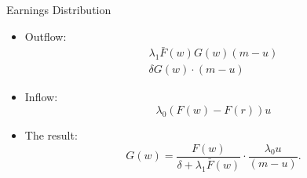 \documentclass{beamer}
\begin{document}
\begin{frame}{Earnings Distribution}
    \begin{itemize}
        \item Outflow:
              \[
                  \begin{gathered}
                      \lambda_{1} \bar{F}(w) G(w)(m-u) \\
                      \delta G(w) \cdot(m-u)
                  \end{gathered}
              \]
        \item Inflow:
              \[
                  \lambda_{0}(F(w)-F(r)) u
              \]
        \item The result:
              \[
                  G(w)=\frac{F(w)}{\delta+\lambda_{1} \bar{F}(w)} \cdot \frac{\lambda_{0} u}{(m-u)} .
              \]
    \end{itemize}
\end{frame}




\end{document}
